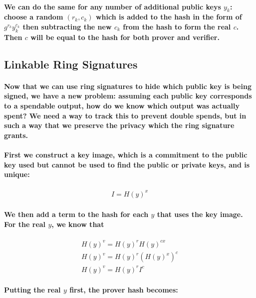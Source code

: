 \documentclass{article}
\begin{document}
\paragraph{We can do the same for any number of additional public keys $y_k$: choose a random $(r_k,c_k)$ which is added to the hash in the form of $g^{r_k}y_k^{c_k}$ then subtracting the new $c_k$ from the hash to form the real $c$. Then $c$ will be equal to the hash for both prover and verifier.}


\subsection{Linkable Ring Signatures}

\paragraph{Now that we can use ring signatures to hide which public key is being signed, we have a new problem: assuming each public key corresponds to a spendable output, how do we know which output was actually spent?  We need a way to track this to prevent double spends, but in such a way that we preserve the privacy which the ring signature grants.}

\paragraph{First we construct a key image, which is a commitment to the public key used but cannot be used to find the public or private keys, and is unique:}

\begin{eqnarray}
  I = H(y)^x
\end{eqnarray}

\paragraph{We then add a term to the hash for each $y$ that uses the key image.  For the real $y$, we know that}

\begin{eqnarray}
  H(y)^v = H(y)^r H(y)^{cx}\\
  H(y)^v = H(y)^r (H(y)^x)^c\\
  H(y)^v = H(y)^r I^c
\end{eqnarray}

\paragraph{Putting the real $y$ first, the prover hash becomes:}
\end{document}
